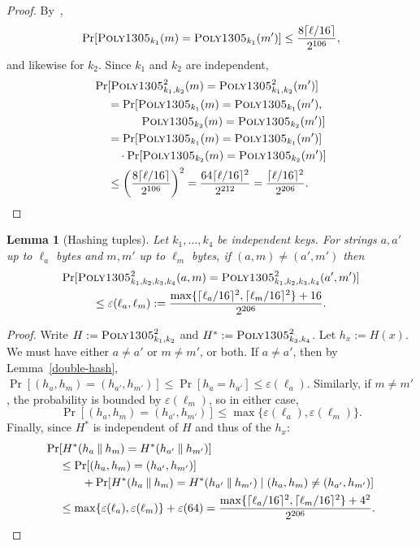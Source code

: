 \documentclass[draft]{article}
\newtheorem{lemma}{Lemma}
\def\operatorsc#1{{%
  \ifmmode\let\next=\operatorname\else\let\next=\relax\fi\next{\textsc{#1}}}}
\def\Poly#1/{\operatorsc{Poly#1}}
\newcommand{\concat}{\mathbin\|}
\newcommand{\given}{\mathrel|}
\newcommand{\collisionbound}{\varepsilon}
\begin{document}
\begin{proof}
  By~\cite[Theorem~3.3]{bernstein2005poly1305},
  \[
    \Pr[\Poly1305/_{k_1}(m) = \Poly1305/_{k_1}(m')]
    \leq \frac{8\lceil\ell/16\rceil}{2^{106}},
  \]
   and likewise for $k_2$.
  Since $k_1$ and $k_2$ are independent,
  \begin{align*}
    \Pr&[\Poly1305/^2_{k_1,k_2}(m) = \Poly1305/^2_{k_1,k_2}(m')] \\
    &= \Pr[\Poly1305/_{k_1}(m) = \Poly1305/_{k_1}(m'), \\
    &\qquad\quad\Poly1305/_{k_2}(m) = \Poly1305/_{k_2}(m')] \\
    &= \Pr[\Poly1305/_{k_1}(m) = \Poly1305/_{k_1}(m')] \\
    &\quad
       \cdot
       \Pr[\Poly1305/_{k_2}(m) = \Poly1305/_{k_2}(m')] \\
    &\leq \biggl(\frac{8\lceil\ell/16\rceil}{2^{106}}\biggr)^2
     = \frac{64\lceil\ell/16\rceil^2}{2^{212}}
     = \frac{\lceil\ell/16\rceil^2}{2^{206}}.
    \qedhere
  \end{align*}
\end{proof}

\begin{lemma}[Hashing tuples]\label{hash-tuple}
  Let $k_1, \dotsc, k_4$ be independent \Poly1305/ keys.
  For strings $a, a'$ up to $\ell_a$ bytes and $m, m'$ up to $\ell_m$
   bytes, if $(a, m) \ne (a', m')$ then
%
  \begin{multline*}
    \Pr[\Poly1305/^2_{k_1,k_2,k_3,k_4}(a, m)
        = \Poly1305/^2_{k_1,k_2,k_3,k_4}(a', m')] \\
    \leq \collisionbound(\ell_a, \ell_m)
    := \frac{\max\{\lceil\ell_a/16\rceil^2, \lceil\ell_m/16\rceil^2\}
             + 16}
            {2^{206}}.
  \end{multline*}
\end{lemma}

\begin{proof}
  Write
   $H := \Poly1305/^2_{k_1,k_2}$ and
   $H^* := \Poly1305/^2_{k_3,k_4}$.
  Let $h_x := H(x)$.
  We must have either $a \ne a'$ or $m \ne m'$, or both.
  If $a \ne a'$, then by Lemma~\ref{double-hash},
   $\Pr[(h_a, h_m) = (h_{a'}, h_{m'})]
    \leq \Pr[h_a = h_{a'}]
    \leq \collisionbound(\ell_a)$.
  Similarly, if $m \ne m'$, the probability is bounded by
   $\collisionbound(\ell_m)$,
   so in either case,
  \[
    \Pr[(h_a, h_m) = (h_{a'}, h_{m'})]
    \leq \max\{\collisionbound(\ell_a), \collisionbound(\ell_m)\}.
  \]
  Finally, since $H^*$ is independent of $H$ and thus of the $h_x$:
%
  \begin{align*}
    \Pr&[H^*(h_a \concat h_m) = H^*(h_{a'} \concat h_{m'})] \\
    &\leq \Pr[(h_a, h_m) = (h_{a'}, h_{m'})] \\
    &\qquad
          + \Pr[H^*(h_a \concat h_m) = H^*(h_{a'} \concat h_{m'})
                \given (h_a, h_m) \ne (h_{a'}, h_{m'})] \\
    &\leq \max\{\collisionbound(\ell_a), \collisionbound(\ell_m)\}
          + \collisionbound(64)
     = \frac{\max\{\lceil\ell_a/16\rceil^2, \lceil\ell_m/16\rceil^2\}
             + 4^2}
            {2^{206}}.
    \qedhere
  \end{align*}
\end{proof}

\end{document}
